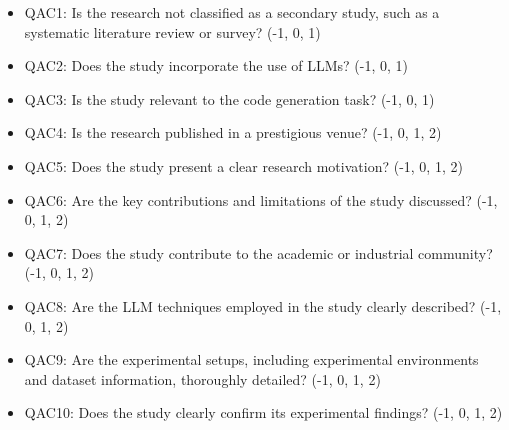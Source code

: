 \begin{itemize} 
    \item QAC1: Is the research not classified as a secondary study, such as a systematic literature review or survey? (-1, 0, 1) 
    \item QAC2: Does the study incorporate the use of LLMs? (-1, 0, 1) 
    \item QAC3: Is the study relevant to the code generation task? (-1, 0, 1) 
    \item QAC4: Is the research published in a prestigious venue? (-1, 0, 1, 2) 
    \item QAC5: Does the study present a clear research motivation? (-1, 0, 1, 2) 
    \item QAC6: Are the key contributions and limitations of the study discussed? (-1, 0, 1, 2) 
    \item QAC7: Does the study contribute to the academic or industrial community? (-1, 0, 1, 2) 
    \item QAC8: Are the LLM techniques employed in the study clearly described? (-1, 0, 1, 2) 
    \item QAC9: Are the experimental setups, including experimental environments and dataset information, thoroughly detailed? (-1, 0, 1, 2) 
    \item QAC10: Does the study clearly confirm its experimental findings? (-1, 0, 1, 2) 
\end{itemize}



